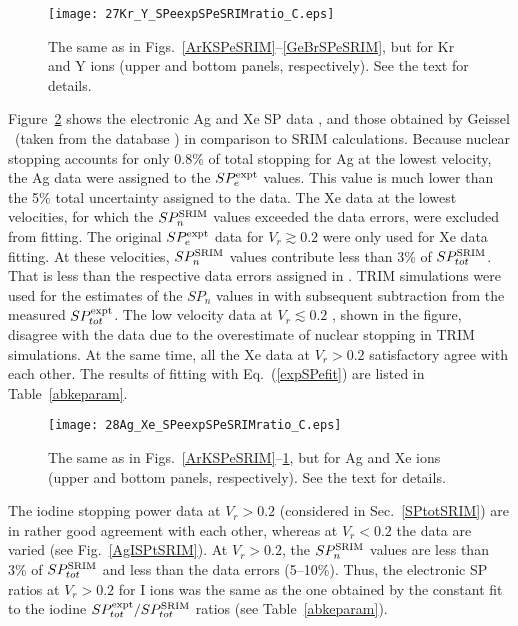 \documentclass[aps,pra,twocolumn,amsmath,amssymb,floatfix]{revtex4-2}
\begin{document}
\begin{figure}[!h]   %
\begin{center}
\texttt{[image: 27Kr\_Y\_SPeexpSPeSRIMratio\_C.eps]}
\caption{\label{KrYSPeSRIM} The same as in Figs.~\ref{ArKSPeSRIM}--\ref{GeBrSPeSRIM}, but for Kr and Y ions (upper and bottom panels, respectively). See the text for details.}
\end{center}
\end{figure}

Figure~\ref{AgXeSPeSRIM} shows the electronic Ag and Xe SP data \cite{Lennard86,BrownMoak72,Pape78,AnthLanf82,Abdess92,Trzaska18,Echler17}, and those obtained by Geissel \ea\ (taken from the database \cite{IAEASP}) in comparison to SRIM calculations. Because nuclear stopping accounts for only 0.8\% of total stopping for Ag at the lowest velocity, the Ag data \cite{Abdess92} were assigned to the $SP_{e}^{\rm expt}$ values. This value is much lower than the 5\% total uncertainty assigned to the data. The Xe data \cite{Trzaska18} at the lowest velocities, for which the $SP_{n}^{\rm SRIM}$ values exceeded the data errors, were excluded from fitting. The original $SP_{e}^{\rm expt}$ data for $V_{r} \gtrsim 0.2$ \cite{Echler17} were only used for Xe data fitting. At these velocities, $SP_{n}^{\rm SRIM}$ values contribute less than 3\% of $SP_{tot}^{\rm SRIM}$. That is less than the respective data errors assigned in \cite{Echler17}. TRIM simulations were used for the estimates of the $SP_{n}$ values in \cite{Echler17} with subsequent subtraction from the measured $SP_{tot}^{\rm expt}$. The low velocity data at $V_{r} \lesssim 0.2$ \cite{Echler17}, shown in the figure, disagree with the data \cite{Lennard86} due to the overestimate of nuclear stopping in TRIM simulations. At the same time, all the Xe data at $V_{r} > 0.2$ satisfactory agree with each other. The results of fitting with Eq.~(\ref{expSPefit}) are listed in Table~\ref{abkeparam}.

\begin{figure}[!h]   %
\begin{center}
\texttt{[image: 28Ag\_Xe\_SPeexpSPeSRIMratio\_C.eps]}
\caption{\label{AgXeSPeSRIM} The same as in Figs.~\ref{ArKSPeSRIM}--\ref{KrYSPeSRIM}, but for Ag and Xe ions (upper and bottom panels, respectively). See the text for details.}
\end{center}
\end{figure}

The iodine stopping power data \cite{BrownMoak72,AnthLanf82,Abdess92} at $V_{r} > 0.2$ (considered in Sec.~\ref{SPtotSRIM}) are in rather good agreement with each other, whereas at $V_{r} < 0.2$ the data \cite{BrownMoak72,AnthLanf82} are varied (see Fig.~\ref{AgISPtSRIM}). At $V_{r} > 0.2$, the $SP_{n}^{\rm SRIM}$ values are less than 3\% of $SP_{tot}^{\rm SRIM}$ and less than the data errors (5--10\%). Thus, the electronic SP ratios at $V_{r} > 0.2$ for I ions was the same as the one obtained by the constant fit to the iodine $SP_{tot}^{\rm expt}/SP_{tot}^{\rm SRIM}$ ratios (see Table~\ref{abkeparam}).
\end{document}
